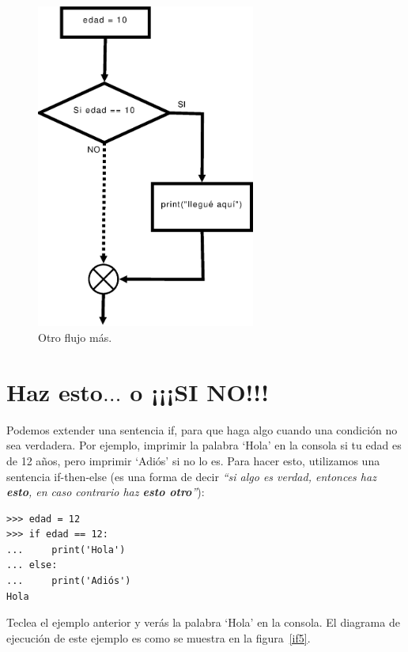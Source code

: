\begin{figure}
\begin{center}
\includegraphics[width=72mm]{if4.eps}
\end{center}
\caption{Otro flujo más.}\label{if4}
\end{figure}

\section{Haz esto$\ldots$ o ¡¡¡SI NO!!!}

Podemos extender una sentencia if, para que haga algo cuando una condición no sea verdadera.  Por ejemplo, imprimir la palabra `Hola' en la consola si tu edad es de 12 años, pero imprimir `Adiós' si no lo es.  Para hacer esto, utilizamos una sentencia if-then-else (es una forma de decir \emph{``si algo es verdad, entonces haz \textbf{esto}, en caso contrario haz \textbf{esto otro}''}):

\begin{listing}
\begin{verbatim}
>>> edad = 12
>>> if edad == 12:
...     print('Hola')
... else:
...     print('Adiós')
Hola
\end{verbatim}
\end{listing}


Teclea el ejemplo anterior y verás la palabra `Hola' en la consola. El diagrama de ejecución de este ejemplo es como se muestra en la figura~\ref{if5}. 

